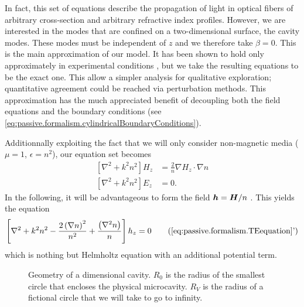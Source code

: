 
In fact, this set of equations describe the propagation of light 
in optical fibers of arbitrary cross-section and arbitrary
refractive index profiles. However, we are interested in the modes
that are confined on a two-dimensional surface, the cavity modes. 
These modes must be independent of $z$ and we therefore take 
$\beta=0$. This is the main approximation of our model. It has been shown
to hold only approximately in experimental conditions \cite{DUB2008,BIT2010}, 
but we take the resulting equations to be the exact one. This allow a 
simpler analysis for qualitative exploration; quantitative agreement
could be reached via perturbation methods. This approximation 
has the much appreciated benefit of decoupling both the field
equations and the boundary conditions (see \eqref{eq:passive.formalism.cylindricalBoundaryConditions}).

Additionnally exploiting the fact that we will only consider
non-magnetic media ($\mu=1$, $\epsilon=n^2$), our equation set becomes
  \begin{subequations}
  \begin{align}
    \left[\nabla^2+k^2n^2\right] H_z	&= \frac{2}{n}\nabla H_z\cdot\nabla n	\label{eq:passive.formalism.TEequation}\\
    \left[\nabla^2+k^2n^2\right] E_z	&= 0. 
  \end{align}
  \end{subequations}
In the following, it will be advantageous to form the field
$\boldsymbol{h}=\boldsymbol{H}/n$ \cite{DET2009}. This yields the equation
\cite{DET2009, GAP2013}
  \begin{equation}
   \left[\nabla^2+k^2n^2-\frac{2\left(\nabla n\right)^2}{n^2}+\frac{\left(\nabla^2n\right)}{n}\right]h_z=0 \tag{\ref{eq:passive.formalism.TEequation}'}
   \label{eq:passive.formalism.TEequationPrime}
  \end{equation}
which is nothing but Helmholtz equation with an additional potential term.

\begin{figure}
 \centering
 \def\svgwidth{0.4\textwidth}
 
 \caption[Geometry of a bidimensional cavity]
	 {Geometry of a dimensional cavity. $R_0$ is the radius of the smallest circle
	 that encloses the physical microcavity. $R_V$ is the radius of a fictional circle
	 that we will take to go to infinity.}
\end{figure}


